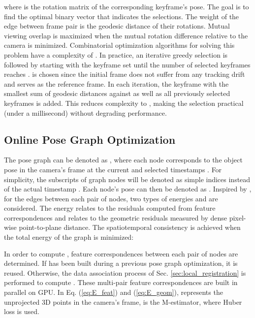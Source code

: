 \documentclass[letterpaper, 10 pt, conference]{ieeeconf}
\begin{document}
\vspace{-0.02in}


\noindent where  is the rotation matrix of the corresponding keyframe's pose. The goal is to find the optimal binary vector  that indicates the selections. The weight of the edge between frame pair  is the geodesic distance of their rotations. Mutual viewing overlap is maximized when the mutual rotation difference relative to the camera is minimized. Combinatorial optimization algorithms for solving this problem have a complexity of  \cite{vassilevska2006finding}. In practice, an iterative greedy selection is followed by starting with the keyframe set  until the number of selected keyframes reaches .  is chosen since the initial frame does not suffer from any tracking drift and serves as the reference frame. In each iteration, the keyframe with the smallest sum of geodesic distances against  as well as all previously selected keyframes is added. This reduces complexity to , making the selection practical (under a millisecond) without degrading performance.


\subsection{Online Pose Graph Optimization}
\label{sec:pose_graph}


The pose graph can be denoted as , where each node corresponds to the object pose in the camera's frame at the current and  selected timestamps . For simplicity, the subscripts of graph nodes will be denoted as simple indices  instead of the actual timestamp .  Each node's pose can then be denoted as .  Inspired by \cite{dai2017bundlefusion}, for the edges between each pair of nodes, two types of energies  and  are considered. The energy  relates to the residuals computed from feature correspondences and  relates to the geometric residuals measured by dense pixel-wise point-to-plane distance. The spatiotemporal consistency is achieved when the total energy of the graph  is minimized:



In order to compute , feature correspondences  between each pair of nodes  are determined. If  has been built during a previous pose graph optimization, it is reused. Otherwise, the data association process of Sec. \ref{sec:local_registration} is performed to compute . These multi-pair feature correspondences are built in parallel on GPU. In Eq. (\ref{eq:E_feat}) and (\ref{eq:E_geom}),  represents the unprojected 3D points in the camera's frame,  is the M-estimator, where Huber loss is used. 
\end{document}
